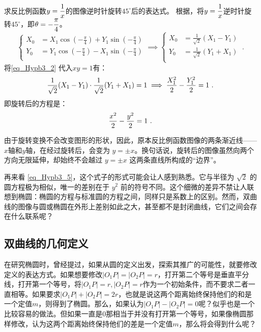 \begin{example}{求反比例函数$\displaystyle y={1\over x}$的图像逆时针旋转$45^\circ$后的表达式。}
根据，将$\displaystyle y={1\over x}$逆时针旋转$45^\circ$，即$\displaystyle\theta=-{\pi\over4}$。
\begin{equation}\label{eq_Hypb3_2}
\begin{cases}
\displaystyle
X_0&=X_1 \cos \left(-{\displaystyle\frac{\pi}{4}}\right) + Y_1 \sin  \left(-{\displaystyle\frac{\pi}{4}}\right)\\
Y_0&=Y_1 \cos  \left(-{\displaystyle\frac{\pi}{4}}\right) - X_1 \sin  \left(-{\displaystyle\frac{\pi}{4}}\right)\\
\end{cases}\implies
\begin{cases}
X_0&={\displaystyle\frac{1}{\sqrt{2}}}(X_1 - Y_1)\\
Y_0&={\displaystyle\frac{1}{\sqrt{2}}}(Y_1+ X_1) \\
\end{cases}~.
\end{equation}
将\autoref{eq_Hypb3_2} 代入$xy=1$有：
\begin{equation}
\displaystyle
{1\over\sqrt{2}}(X_1 - Y_1)\cdot{1\over\sqrt{2}}(Y_1+ X_1)=1\implies {X_1^2\over2}- {Y_1^2\over2}=1~.
\end{equation}
即旋转后的方程是：
\begin{equation}\label{eq_Hypb3_5}
{x^2\over2}- {y^2\over2}=1~.
\end{equation}
\end{example}


由于旋转变换不会改变图形的形状，因此，原本反比例函数图像的两条渐近线——$x$轴和$y$轴，在经过旋转后，会变为 $y = \pm x$。换句话说，旋转后的图像虽然向两个方向无限延伸，却始终不会越过 $y = \pm x$ 这两条直线所构成的“边界”。

再来看 \autoref{eq_Hypb3_5}，这个式子的形式可能会让人感到熟悉。它与半径为 $\sqrt{2}$ 的圆方程极为相似，唯一的差别在于 $y^2$ 前的符号不同。这个细微的差异不禁让人联想到椭圆：椭圆的方程与标准圆的方程之间，同样只是系数上的区别。然而，双曲线的图像与圆或椭圆在外形上差别如此之大，甚至都不是封闭曲线，它们之间会存在什么联系呢？

\subsection{双曲线的几何定义}

在研究椭圆时，曾经提过，如果从圆的定义出发，探索其推广的可能性，就要修改定义的表达方式。如果想要修改$|O_1P|=|O_2P|=r$，打开第二个等号是垂直平分线，打开第一个等号，将$|O_1P|=r,|O_2P|=r$作为一个初始条件，而不要求二者一直相等。如果要求$|O_1P|+|O_2P|=2r$，也就是说这两个距离始终保持他们的和是一个定值$m$，则得到了椭圆。那么，如果认为$|O_1P|-|O_2P|=0$呢？似乎也是一个比较容易的做法。但如果一直是$0$那相当于并没有打开第一个等号，如果像椭圆那样修改，认为这两个距离始终保持他们的差是一个定值$m$，那么将会得到什么呢？

